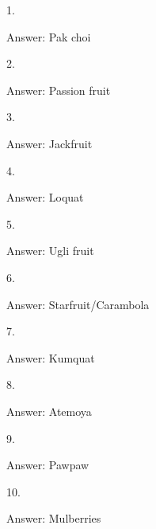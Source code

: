 \documentclass{beamer}
\begin{document}

    \begin{frame}
        1.

        Answer: Pak choi
    \end{frame}

    \begin{frame}
        2.

        Answer: Passion fruit
    \end{frame}

    \begin{frame}
        3.

        Answer: Jackfruit
    \end{frame}

    \begin{frame}
        4.

        Answer: Loquat
    \end{frame}

    \begin{frame}
        5.

        Answer: Ugli fruit
    \end{frame}

    \begin{frame}
        6.

        Answer: Starfruit/Carambola
    \end{frame}

    \begin{frame}
        7.

        Answer: Kumquat
    \end{frame}

    \begin{frame}
        8.

        Answer: Atemoya
    \end{frame}

    \begin{frame}
        9.

        Answer: Pawpaw
    \end{frame}

    \begin{frame}
        10.

        Answer: Mulberries
    \end{frame}
\end{document}
